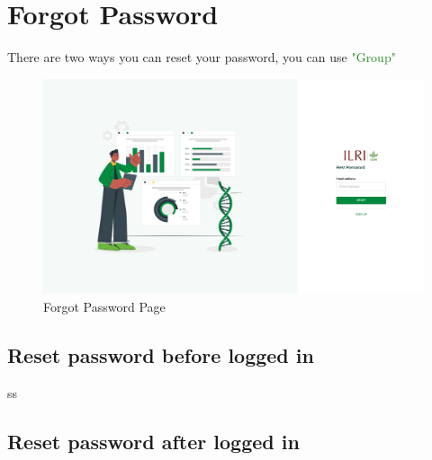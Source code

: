 \section{Forgot Password}
There are two ways you can reset your password, you can use  \textcolor{ForestGreen}{"Group"}
\begin{figure}[h!]
  	\includegraphics[width=15cm]{screenshots/forgot_password_page.png}
  	\caption{Forgot Password Page}
  	\label{fig:forgot_password_page}
\end{figure}

\subsection{Reset password before logged in}ss\begin{equation}
\end{equation}

\subsection{Reset password after logged in}